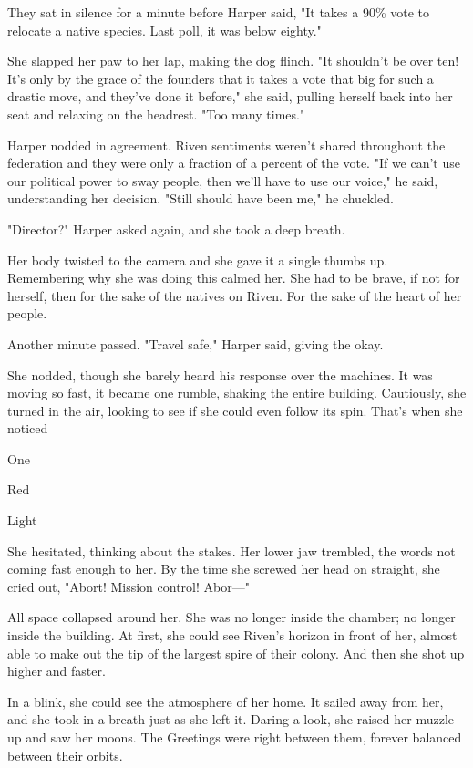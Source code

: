They sat in silence for a minute before Harper said, "It takes a 90\% vote to relocate a native species. Last poll, it was below eighty."

She slapped her paw to her lap, making the dog flinch. "It shouldn't be over ten! It's only by the grace of the founders that it takes a vote that big for such a drastic move, and they've done it before," she said, pulling herself back into her seat and relaxing on the headrest. "Too many times."

Harper nodded in agreement. Riven sentiments weren't shared throughout the federation and they were only a fraction of a percent of the vote. "If we can't use our political power to sway people, then we'll have to use our voice," he said, understanding her decision. "Still should have been me," he chuckled.

\secdiv

"Director?" Harper asked again, and she took a deep breath.

Her body twisted to the camera and she gave it a single thumbs up. Remembering why she was doing this calmed her. She had to be brave, if not for herself, then for the sake of the natives on Riven. For the sake of the heart of her people.

Another minute passed. "Travel safe," Harper said, giving the okay.

She nodded, though she barely heard his response over the machines. It was moving so fast, it became one rumble, shaking the entire building. Cautiously, she turned in the air, looking to see if she could even follow its spin. That's when she noticed

One

Red

Light

She hesitated, thinking about the stakes. Her lower jaw trembled, the words not coming fast enough to her. By the time she screwed her head on straight, she cried out, "Abort! Mission control! Abor---"

All space collapsed around her. She was no longer inside the chamber; no longer inside the building. At first, she could see Riven's horizon in front of her, almost able to make out the tip of the largest spire of their colony. And then she shot up higher and faster.

In a blink, she could see the atmosphere of her home. It sailed away from her, and she took in a breath just as she left it. Daring a look, she raised her muzzle up and saw her moons. The Greetings were right between them, forever balanced between their orbits.

